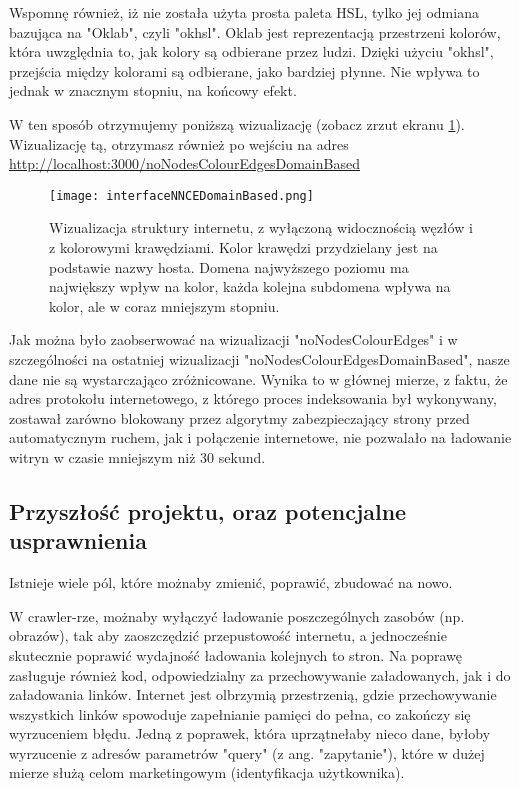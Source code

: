 \documentclass[a4paper, 12pt]{article}
\begin{document}
Wspomnę również, iż nie została użyta prosta paleta HSL, tylko jej odmiana bazująca na "Oklab", czyli "okhsl". Oklab jest reprezentacją przestrzeni kolorów, która uwzględnia to, jak kolory są odbierane przez ludzi.\cite{oklabOttosson} Dzięki użyciu "okhsl", przejścia między kolorami są odbierane, jako bardziej płynne. Nie wpływa to jednak w znacznym stopniu, na końcowy efekt.

W ten sposób otrzymujemy poniższą wizualizację (zobacz zrzut ekranu \ref{fig:nncedb}). Wizualizację tą, otrzymasz również po wejściu na adres \url{http://localhost:3000/noNodesColourEdgesDomainBased}

\begin{figure}[H]
	\centering
	\texttt{[image: interfaceNNCEDomainBased.png]}
	\caption{Wizualizacja struktury internetu, z wyłączoną widocznością węzłów i z kolorowymi krawędziami. Kolor krawędzi przydzielany jest na podstawie nazwy hosta. Domena najwyższego poziomu ma największy wpływ na kolor, każda kolejna subdomena wpływa na kolor, ale w coraz mniejszym stopniu.}
	\label{fig:nncedb}
\end{figure}

Jak można było zaobserwować na wizualizacji "noNodesColourEdges" i w szczególności na ostatniej wizualizacji "noNodesColourEdgesDomainBased", nasze dane nie są wystarczająco zróżnicowane. Wynika to w głównej mierze, z faktu, że adres protokołu internetowego, z którego proces indeksowania był wykonywany, zostawał zarówno blokowany przez algorytmy zabezpieczający strony przed automatycznym ruchem, jak i połączenie internetowe, nie pozwalało na ładowanie witryn w czasie mniejszym niż 30 sekund.

\subsection{Przyszłość projektu, oraz potencjalne usprawnienia}
Istnieje wiele pól, które możnaby zmienić, poprawić, zbudować na nowo.

W crawler-rze, możnaby wyłączyć ładowanie poszczególnych zasobów (np. obrazów), tak aby zaoszczędzić przepustowość internetu, a jednocześnie skutecznie poprawić wydajność ładowania kolejnych to stron. Na poprawę zasługuje również kod, odpowiedzialny za przechowywanie załadowanych, jak i do załadowania linków. Internet jest olbrzymią przestrzenią, gdzie przechowywanie wszystkich linków spowoduje zapełnianie pamięci do pełna, co zakończy się wyrzuceniem błędu. Jedną z poprawek, która uprzątnełaby nieco dane, byłoby wyrzucenie z adresów parametrów "query" (z ang. "zapytanie"), które w dużej mierze służą celom marketingowym (identyfikacja użytkownika).
\end{document}
